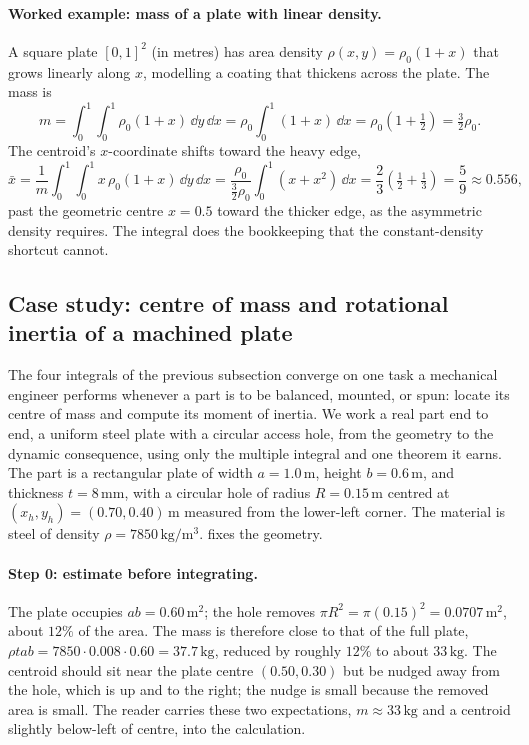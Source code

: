 \paragraph{Worked example: mass of a plate with linear density.} A
square plate $[0, 1]^{2}$ (in metres) has area density $\rho(x, y) =
\rho_{0}(1 + x)$ that grows linearly along $x$, modelling a coating
that thickens across the plate. The mass is
\[
m = \int_{0}^{1}\!\int_{0}^{1}\rho_{0}(1 + x)\,\dd y\,\dd x
= \rho_{0}\int_{0}^{1}(1 + x)\,\dd x
= \rho_{0}\left(1 + \tfrac{1}{2}\right) = \tfrac{3}{2}\rho_{0}.
\]
The centroid's $x$-coordinate shifts toward the heavy edge,
\[
\bar{x} = \frac{1}{m}\int_{0}^{1}\!\int_{0}^{1} x\,\rho_{0}(1 + x)
\,\dd y\,\dd x = \frac{\rho_{0}}{\tfrac{3}{2}\rho_{0}}
\int_{0}^{1}(x + x^{2})\,\dd x
= \frac{2}{3}\left(\tfrac{1}{2} + \tfrac{1}{3}\right)
= \frac{5}{9} \approx 0.556,
\]
past the geometric centre $x = 0.5$ toward the thicker edge, as the
asymmetric density requires. The integral does the bookkeeping that
the constant-density shortcut cannot.

\subsection{Case study: centre of mass and rotational inertia of a
machined plate}

The four integrals of the previous subsection converge on one task a
mechanical engineer performs whenever a part is to be balanced,
mounted, or spun: locate its centre of mass and compute its moment of
inertia. We work a real part end to end, a uniform steel plate with a
circular access hole, from the geometry to the dynamic consequence,
using only the multiple integral and one theorem it earns. The part
is a rectangular plate of width $a = 1.0\,\si{\meter}$, height $b =
0.6\,\si{\meter}$, and thickness $t = 8\,\si{\milli\meter}$, with a
circular hole of radius $R = 0.15\,\si{\meter}$ centred at $(x_{h},
y_{h}) = (0.70, 0.40)\,\si{\meter}$ measured from the lower-left
corner. The material is steel of density $\rho =
7850\,\si{\kilogram\per\meter\cubed}$.
 fixes the geometry.



\paragraph{Step 0: estimate before integrating.} The plate occupies
$a b = 0.60\,\si{\meter\squared}$; the hole removes $\pi R^{2} =
\pi(0.15)^{2} = 0.0707\,\si{\meter\squared}$, about $12\%$ of the
area. The mass is therefore close to that of the full plate, $\rho t
a b = 7850\cdot 0.008\cdot 0.60 = 37.7\,\si{\kilogram}$, reduced by
roughly $12\%$ to about $33\,\si{\kilogram}$. The centroid should sit
near the plate centre $(0.50, 0.30)$ but be nudged away from the
hole, which is up and to the right; the nudge is small because the
removed area is small. The reader carries these two expectations,
$m \approx 33\,\si{\kilogram}$ and a centroid slightly below-left of
centre, into the calculation.

